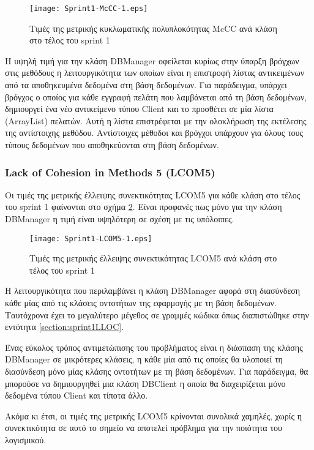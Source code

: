 \begin{figure}
\centering
\texttt{[image: Sprint1-McCC-1.eps]}
\caption{Τιμές της μετρικής κυκλωματικής πολυπλοκότητας McCC ανά κλάση στο τέλος του sprint 1}
\label{fig:sprint1McCC}
\end{figure}

H υψηλή τιμή για την κλάση DBManager οφείλεται κυρίως στην
ύπαρξη βρόγχων στις μεθόδους η λειτουργικότητα των οποίων είναι η
επιστροφή λίστας αντικειμένων από τα αποθηκευμένα δεδομένα στη βάση
δεδομένων. Για παράδειγμα, υπάρχει βρόγχος ο οποίος για κάθε εγγραφή
πελάτη που λαμβάνεται από τη βάση δεδομένων, δημιουργεί ένα νέο
αντικείμενο τύπου Client και το προσθέτει σε μία λίστα (ArrayList)
πελατών. Αυτή η λίστα επιστρέφεται με την ολοκλήρωση της εκτέλεσης της
αντίστοιχης μεθόδου. Αντίστοιχες μέθοδοι και βρόγχοι υπάρχουν για όλους
τους τύπους δεδομένων που αποθηκεύονται στη βάση δεδομένων.

\subsubsection{Lack of Cohesion in Methods 5 (LCOM5)}
\label{section:sprint1LCOM5}

Οι τιμές της μετρικής έλλειψης συνεκτικότητας LCOM5 για κάθε κλάση στο
τέλος του sprint 1 φαίνονται στο σχήμα \ref{fig:sprint1LCOM5}. Είναι
προφανές πως μόνο για την κλάση DBManager η τιμή είναι υψηλότερη σε
σχέση με τις υπόλοιπες.

\begin{figure}
\centering
\texttt{[image: Sprint1-LCOM5-1.eps]}
\caption{Τιμές της μετρικής έλλειψης συνεκτικότητας LCOM5 ανά κλάση στο τέλος του sprint 1}
\label{fig:sprint1LCOM5}
\end{figure}

Η λειτουργικότητα που περιλαμβάνει η κλάση DBManager αφορά στη
διασύνδεση κάθε μίας από τις κλάσεις οντοτήτων της εφαρμογής με τη βάση
δεδομένων. Ταυτόχρονα έχει το μεγαλύτερο μέγεθος
σε γραμμές κώδικα όπως διαπιστώθηκε στην εντότητα
\ref{section:sprint1LLOC}.

Ένας εύκολος τρόπος αντιμετώπισης του προβλήματος είναι η διάσπαση της
κλάσης DBManager σε μικρότερες κλάσεις, η κάθε μία από τις οποίες
θα υλοποιεί τη διασύνδεση μόνο μίας κλάσης οντοτήτων με τη βάση
δεδομένων. Για παράδειγμα, θα μπορούσε να δημιουργηθεί μια κλάση
DBClient η οποία θα διαχειρίζεται μόνο δεδομένα τύπου Client και τίποτα
άλλο.

Ακόμα κι έτσι, οι τιμές της μετρικής LCOM5 κρίνονται συνολικά χαμηλές,
χωρίς η συνεκτικότητα σε αυτό το σημείο να αποτελεί πρόβλημα για την
ποιότητα του λογισμικού.

